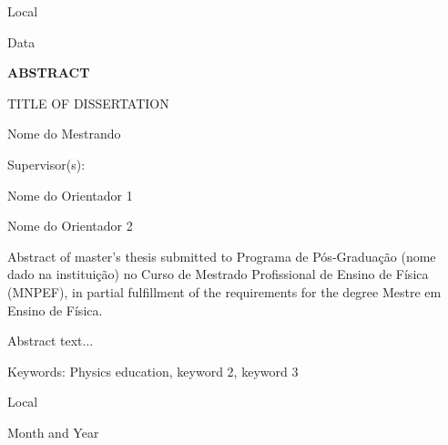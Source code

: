 \documentclass[a4paper,12pt,oneside]{book}
\begin{document}
\begin{center}
Local

Data
\end{center}

\newpage

\begin{center}
	\textbf{ABSTRACT}
\end{center}

\begin{center}	
	TITLE OF DISSERTATION
\end{center}

\begin{center}
	Nome do Mestrando
\end{center}

\begin{center}
	Supervisor(s):
	
Nome do Orientador 1

Nome do Orientador 2 
\end{center} 

\begin{center} \justifying
	\noindent Abstract of master’s thesis submitted to Programa de Pós-Graduação (nome dado na instituição) no Curso de Mestrado Profissional de Ensino de Física (MNPEF), in partial fulfillment of the requirements for the degree Mestre em Ensino de Física.
\end{center}


\noindent Abstract text...


Keywords: Physics education, keyword 2, keyword 3

\vspace{14cm} %

\begin{center}
Local

Month and Year
\end{center}

\newpage
\end{document}
